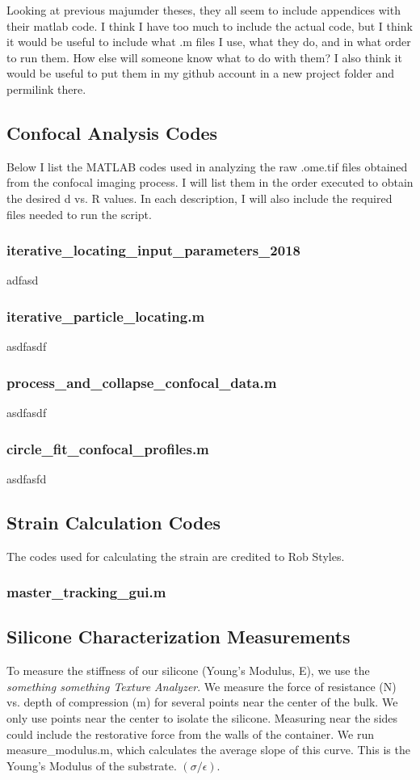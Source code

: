 Looking at previous majumder theses, they all seem to include appendices with their matlab code. I think I have too much to include the actual code, but I think it would be useful to include what .m files I use, what they do, and in what order to run them. How else will someone know what to do with them? I also think it would be useful to put them in my github account in a new project folder and permilink there.

\subsection{Confocal Analysis Codes}
Below I list the MATLAB codes used in analyzing the raw .ome.tif files obtained from the confocal imaging process. I will list them in the order executed to obtain the desired d vs. R values. In each description, I will also include the required files needed to run the script.

\subsubsection*{iterative\_locating\_input\_parameters\_2018}
adfasd
\subsubsection*{iterative\_particle\_locating.m}
asdfasdf
\subsubsection*{process\_and\_collapse\_confocal\_data.m}
asdfasdf
\subsubsection*{circle\_fit\_confocal\_profiles.m}
asdfasfd

\subsection{Strain Calculation Codes}
The codes used for calculating the strain are credited to Rob Styles.  

\subsubsection{\textsf{master\_tracking\_gui.m}}


\subsection{Silicone Characterization Measurements}
To measure the stiffness of our silicone (Young's Modulus, E), we use the \emph{something something Texture Analyzer}. We measure the force of resistance (N) vs. depth of compression (m) for several points near the center of the bulk. We only use points near the center to isolate the silicone. Measuring near the sides could include the restorative force from the walls of the container. We run \textsf{measure\_modulus.m}, which calculates the average slope of this curve. This is the Young's Modulus of the substrate.  $(\sigma/\epsilon)$.